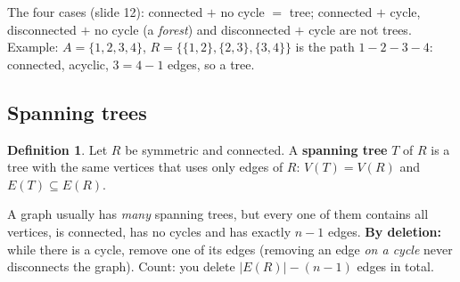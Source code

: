 \documentclass{fkt-notes}
\theoremstyle{definition}
\newtheorem*{defn}{Definition}
\begin{document}
\noindent The four cases (slide 12): connected $+$ no cycle $=$ tree;
connected $+$ cycle, disconnected $+$ no cycle (a \emph{forest}) and
disconnected $+$ cycle are not trees. Example: $A=\{1,2,3,4\}$,
$R=\{\{1,2\},\{2,3\},\{3,4\}\}$ is the path $1-2-3-4$: connected, acyclic,
$3=4-1$ edges, so a tree.

\subsection{Spanning trees}
%
\begin{defn}
  Let $R$ be symmetric and connected. A \textbf{spanning tree} $T$ of $R$
  is a tree with the same vertices that uses only edges of $R$:
  $V(T)=V(R)$ and $E(T)\subseteq E(R)$.
\end{defn}
A graph usually has \emph{many} spanning trees, but every one of them
contains all vertices, is connected, has no cycles and has exactly
$n-1$ edges. \textbf{By deletion:} while there is a cycle, remove one of
its edges (removing an edge \emph{on a cycle} never disconnects the
graph). Count: you delete $|E(R)|-(n-1)$ edges in total.
\end{document}
